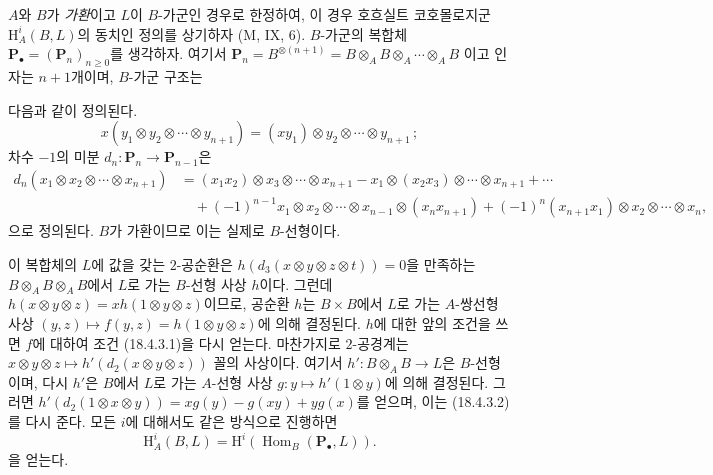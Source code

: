 \begin{env}[18.4.4]
\label{0.18.4.4-fr}
$A$와 $B$가 \emph{가환}이고 $L$이 $B$-가군인 경우로 한정하여,
이 경우 호흐실트 코호몰로지군 $\mathrm H_A^i(B,L)$의 동치인 정의를
상기하자 (M, IX, 6). $B$-가군의 복합체
$\mathbf P_\bullet=(\mathbf P_n)_{n\geqslant0}$를 생각하자. 여기서
$\mathbf P_n=B^{\otimes(n+1)}=B\otimes_A B\otimes_A\cdots\otimes_A B$
이고 인자는 $n+1$개이며, $B$-가군 구조는


다음과 같이 정의된다.
\[
  x(y_1\otimes y_2\otimes\cdots\otimes y_{n+1})
  =(xy_1)\otimes y_2\otimes\cdots\otimes y_{n+1}\,;
\]
차수 $-1$의 미분 $d_n:\mathbf P_n\to\mathbf P_{n-1}$은
\begin{align*}
  d_n(x_1\otimes x_2\otimes\cdots\otimes x_{n+1})
    &=(x_1x_2)\otimes x_3\otimes\cdots\otimes x_{n+1}
      -x_1\otimes(x_2x_3)\otimes\cdots\otimes x_{n+1}+\cdots\\
    &\quad+(-1)^{n-1}x_1\otimes x_2\otimes\cdots\otimes x_{n-1}
      \otimes(x_nx_{n+1})
      +(-1)^n(x_{n+1}x_1)\otimes x_2\otimes\cdots\otimes x_n,
\end{align*}
으로 정의된다. $B$가 가환이므로 이는 실제로 $B$-선형이다.

이 복합체의 $L$에 값을 갖는 $2$-공순환은
$h(d_3(x\otimes y\otimes z\otimes t))=0$을 만족하는
$B\otimes_A B\otimes_A B$에서 $L$로 가는 $B$-선형 사상 $h$이다.
그런데 $h(x\otimes y\otimes z)=xh(1\otimes y\otimes z)$이므로,
공순환 $h$는 $B\times B$에서 $L$로 가는 $A$-쌍선형 사상
$(y,z)\longmapsto f(y,z)=h(1\otimes y\otimes z)$에 의해 결정된다.
$h$에 대한 앞의 조건을 쓰면 $f$에 대하여 조건 (18.4.3.1)을 다시
얻는다. 마찬가지로 $2$-공경계는
$x\otimes y\otimes z\longmapsto h'(d_2(x\otimes y\otimes z))$ 꼴의
사상이다. 여기서 $h':B\otimes_A B\to L$은 $B$-선형이며, 다시
$h'$은 $B$에서 $L$로 가는 $A$-선형 사상
$g:y\longmapsto h'(1\otimes y)$에 의해 결정된다. 그러면
$h'(d_2(1\otimes x\otimes y))=xg(y)-g(xy)+yg(x)$를 얻으며,
이는 (18.4.3.2)를 다시 준다. 모든 $i$에 대해서도 같은 방식으로
진행하면
\begin{equation}
\label{0.18.4.4.1-fr}
\tag{18.4.4.1}
  \mathrm H_A^i(B,L)=\mathrm H^i(\operatorname{Hom}_B(\mathbf P_\bullet,L)).
\end{equation}
을 얻는다.
\end{env}

